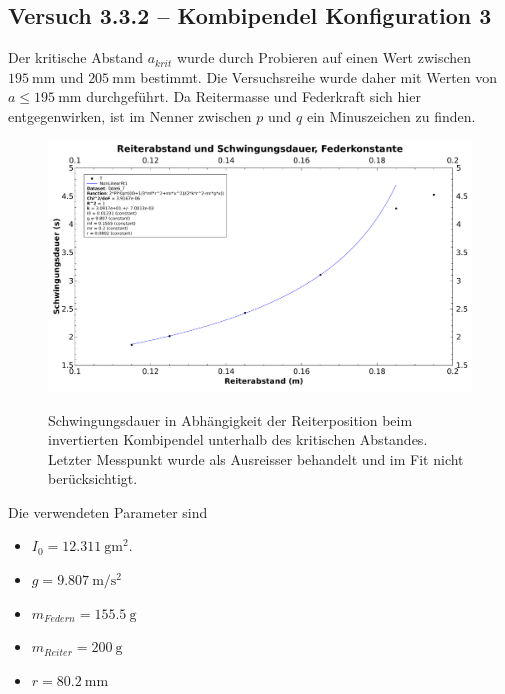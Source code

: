 \clearpage
\subsection{Versuch 3.3.2 -- Kombipendel Konfiguration 3}
\label{subsec:kombiKonfig3}

Der  kritische  Abstand  $a_{krit}$  wurde  durch  Probieren  auf  einen  Wert
zwischen  $\SI{195}{\milli\meter}$ und  $\SI{205}{\milli\meter}$ bestimmt. Die
Versuchsreihe  wurde  daher mit  Werten  von  $a \leq  \SI{195}{\milli\meter}$
durchgef\"uhrt. Da Reitermasse und Federkraft sich hier entgegenwirken, ist im
Nenner zwischen $p$ und $q$ ein Minuszeichen zu finden.

\begin{figure}[h!]
    \centering
    \includegraphics[width=\textwidth]{images/332.pdf}
    \label{fig:pendelKonfigs}
    \caption{%
        Schwingungsdauer in Abh\"angigkeit der Reiterposition beim invertierten Kombipendel unterhalb des kritischen Abstandes. Letzter Messpunkt wurde als Ausreisser behandelt und im Fit nicht ber\"ucksichtigt.
    }
\end{figure}

Die verwendeten Parameter sind
\begin{itemize}
    \item
        $I_0  = \SI[separate-uncertainty = true]{12.311}{\gram\meter\squared}$.
    \item
        $g = \SI{9.807}{\meter\per\second\squared}$
    \item
        $m_{Federn} = \SI{155.5}{\gram}$
    \item
        $m_{Reiter} = \SI{200}{\gram}$
    \item
        $r = \SI{80.2}{\milli\meter}$
\end{itemize}

